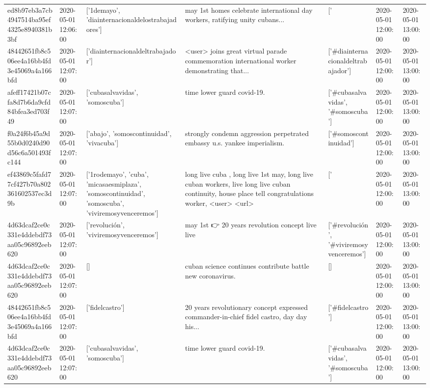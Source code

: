 \begin{tabular}{lllllll}
ed8b97eb3a7cb4947514ba95ef4325e8940381b3bf & 2020-05-01 12:06:00 & ['1demayo', 'diainternacionaldelostrabajadores'] & may 1st homes celebrate international day workers, ratifying unity cubans... & ['#1demayo', '#diainternacionaldelostrabajadores'] & 2020-05-01 12:00:00 & 2020-05-01 13:00:00 \\
48442651fb8c506ee4a16bb4fd3e45069a4a166bfd & 2020-05-01 12:07:00 & ['diainternacionaldeltrabajador'] & <user> joins great virtual parade commemoration international worker demonstrating that... & ['#diainternacionaldeltrabajador'] & 2020-05-01 12:00:00 & 2020-05-01 13:00:00 \\
afeff17421b07cfa8d7b6da9cfd84bfea3ed703f49 & 2020-05-01 12:07:00 & ['cubasalvavidas', 'somoscuba'] & time lower guard covid-19. & ['#cubasalvavidas', '#somoscuba'] & 2020-05-01 12:00:00 & 2020-05-01 13:00:00 \\
f0a24f6b45a9d55b0d0240d90d56c6a501493fc144 & 2020-05-01 12:07:00 & ['abajo', 'somoscontinuidad', 'vivacuba'] & strongly condemn aggression perpetrated embassy u.s. yankee imperialism. & ['#somoscontinuidad'] & 2020-05-01 12:00:00 & 2020-05-01 13:00:00 \\
ef43869c5fafd77cf427b70a802361602537ec3d9b & 2020-05-01 12:07:00 & ['1rodemayo', 'cuba', 'micasaesmiplaza', 'somoscontinuidad', 'somoscuba', 'viviremosyvenceremos'] & long live cuba , long live 1st may, long live cuban workers, live long live cuban continuity, house place tell congratulations worker, <user> <url> & ['#1rodemayo', '#cuba', '#micasaesmiplaza', '#somoscontinuidad', '#somoscuba', '#viviremosyvenceremos'] & 2020-05-01 12:00:00 & 2020-05-01 13:00:00 \\
4d63dcaf2ce0c331e4ddebdf73aa05c96892eeb620 & 2020-05-01 12:07:00 & ['revolución', 'viviremosyvenceremos'] & may 1st 👉 20 years revolution concept live live & ['#revolución', '#viviremosyvenceremos'] & 2020-05-01 12:00:00 & 2020-05-01 13:00:00 \\
4d63dcaf2ce0c331e4ddebdf73aa05c96892eeb620 & 2020-05-01 12:07:00 & [] & cuban science continues contribute battle new coronavirus. & [] & 2020-05-01 12:00:00 & 2020-05-01 13:00:00 \\
48442651fb8c506ee4a16bb4fd3e45069a4a166bfd & 2020-05-01 12:07:00 & ['fidelcastro'] & 20 years revolutionary concept expressed commander-in-chief fidel castro, day day his... & ['#fidelcastro'] & 2020-05-01 12:00:00 & 2020-05-01 13:00:00 \\
4d63dcaf2ce0c331e4ddebdf73aa05c96892eeb620 & 2020-05-01 12:07:00 & ['cubasalvavidas', 'somoscuba'] & time lower guard covid-19. & ['#cubasalvavidas', '#somoscuba'] & 2020-05-01 12:00:00 & 2020-05-01 13:00:00 \\

\end{tabular}
